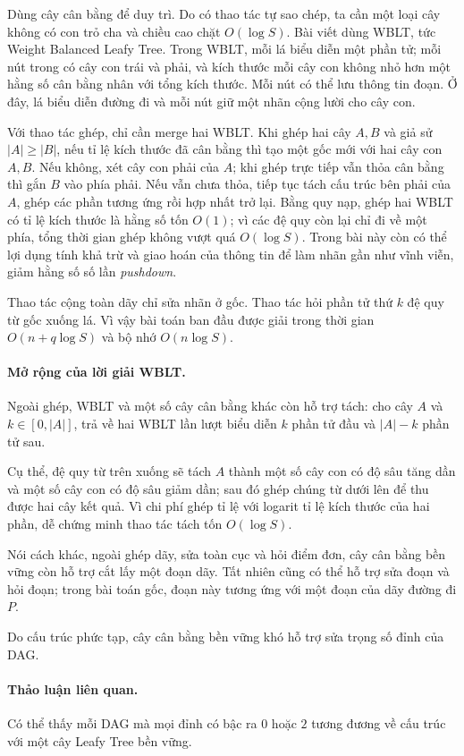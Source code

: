 \documentclass[11pt]{article}
\begin{document}
Dùng cây cân bằng để duy trì. Do có thao tác tự sao chép, ta cần một loại cây
không có con trỏ cha và chiều cao chặt $O(\log S)$. Bài viết dùng WBLT, tức
Weight Balanced Leafy Tree. Trong WBLT, mỗi lá biểu diễn một phần tử; mỗi nút
trong có cây con trái và phải, và kích thước mỗi cây con không nhỏ hơn một hằng
số cân bằng nhân với tổng kích thước. Mỗi nút có thể lưu thông tin đoạn. Ở đây,
lá biểu diễn đường đi và mỗi nút giữ một nhãn cộng lười cho cây con.

Với thao tác ghép, chỉ cần merge hai WBLT. Khi ghép hai cây $A,B$ và giả sử
$|A|\ge |B|$, nếu tỉ lệ kích thước đã cân bằng thì tạo một gốc mới với hai cây
con $A,B$. Nếu không, xét cây con phải của $A$; khi ghép trực tiếp vẫn thỏa cân
bằng thì gắn $B$ vào phía phải. Nếu vẫn chưa thỏa, tiếp tục tách cấu trúc bên
phải của $A$, ghép các phần tương ứng rồi hợp nhất trở lại. Bằng quy nạp, ghép
hai WBLT có tỉ lệ kích thước là hằng số tốn $O(1)$; vì các đệ quy còn lại chỉ đi
về một phía, tổng thời gian ghép không vượt quá $O(\log S)$. Trong bài này còn
có thể lợi dụng tính khả trừ và giao hoán của thông tin để làm nhãn gần như
vĩnh viễn, giảm hằng số số lần \emph{pushdown}.

Thao tác cộng toàn dãy chỉ sửa nhãn ở gốc. Thao tác hỏi phần tử thứ $k$ đệ quy
từ gốc xuống lá. Vì vậy bài toán ban đầu được giải trong thời gian
$O(n+q\log S)$ và bộ nhớ $O(n\log S)$.

\paragraph{Mở rộng của lời giải WBLT.}
Ngoài ghép, WBLT và một số cây cân bằng khác còn hỗ trợ tách: cho cây $A$ và
$k\in[0,|A|]$, trả về hai WBLT lần lượt biểu diễn $k$ phần tử đầu và
$|A|-k$ phần tử sau.

Cụ thể, đệ quy từ trên xuống sẽ tách $A$ thành một số cây con có độ sâu tăng dần
và một số cây con có độ sâu giảm dần; sau đó ghép chúng từ dưới lên để thu được
hai cây kết quả. Vì chi phí ghép tỉ lệ với logarit tỉ lệ kích thước của hai
phần, dễ chứng minh thao tác tách tốn $O(\log S)$.

Nói cách khác, ngoài ghép dãy, sửa toàn cục và hỏi điểm đơn, cây cân bằng bền
vững còn hỗ trợ cắt lấy một đoạn dãy. Tất nhiên cũng có thể hỗ trợ sửa đoạn và
hỏi đoạn; trong bài toán gốc, đoạn này tương ứng với một đoạn của dãy đường đi
$P$.

Do cấu trúc phức tạp, cây cân bằng bền vững khó hỗ trợ sửa trọng số đỉnh của
DAG.

\paragraph{Thảo luận liên quan.}
Có thể thấy mỗi DAG mà mọi đỉnh có bậc ra $0$ hoặc $2$ tương đương về cấu trúc
với một cây Leafy Tree bền vững.
\end{document}
